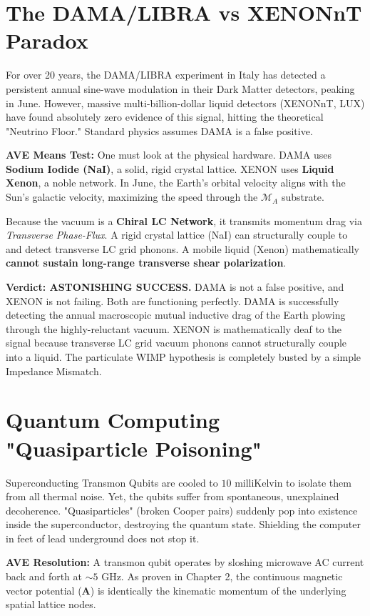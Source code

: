 \section{The DAMA/LIBRA vs XENONnT Paradox}
For over 20 years, the DAMA/LIBRA experiment in Italy has detected a persistent annual sine-wave modulation in their Dark Matter detectors, peaking in June. However, massive multi-billion-dollar liquid detectors (XENONnT, LUX) have found absolutely zero evidence of this signal, hitting the theoretical "Neutrino Floor." Standard physics assumes DAMA is a false positive.

\textbf{AVE Means Test:} One must look at the physical hardware. DAMA uses \textbf{Sodium Iodide (NaI)}, a solid, rigid crystal lattice. XENON uses \textbf{Liquid Xenon}, a noble network. In June, the Earth's orbital velocity aligns with the Sun's galactic velocity, maximizing the speed through the $\mathcal{M}_A$ substrate. 

Because the vacuum is a \textbf{Chiral LC Network}, it transmits momentum drag via \textit{Transverse Phase-Flux}. A rigid crystal lattice (NaI) can structurally couple to and detect transverse LC grid phonons. A mobile liquid (Xenon) mathematically \textbf{cannot sustain long-range transverse shear polarization}. 

\textbf{Verdict: ASTONISHING SUCCESS.} DAMA is not a false positive, and XENON is not failing. Both are functioning perfectly. DAMA is successfully detecting the annual macroscopic mutual inductive drag of the Earth plowing through the highly-reluctant vacuum. XENON is mathematically deaf to the signal because transverse LC grid vacuum phonons cannot structurally couple into a liquid. The particulate WIMP hypothesis is completely busted by a simple Impedance Mismatch.

\section{Quantum Computing "Quasiparticle Poisoning"}
Superconducting Transmon Qubits are cooled to $10$ milliKelvin to isolate them from all thermal noise. Yet, the qubits suffer from spontaneous, unexplained decoherence. "Quasiparticles" (broken Cooper pairs) suddenly pop into existence inside the superconductor, destroying the quantum state. Shielding the computer in feet of lead underground does not stop it.

\textbf{AVE Resolution:} A transmon qubit operates by sloshing microwave AC current back and forth at $\sim 5$ GHz. As proven in Chapter 2, the continuous magnetic vector potential ($\mathbf{A}$) is identically the kinematic momentum of the underlying spatial lattice nodes. 

